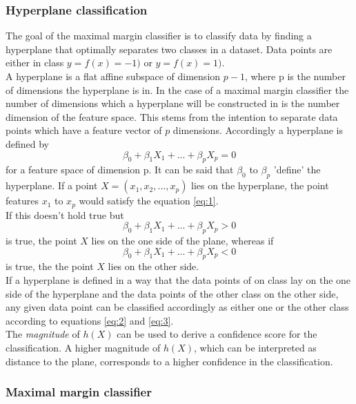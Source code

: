 \subsubsection*{Hyperplane classification}
The goal of the maximal margin classifier is to classify data by finding a hyperplane that optimally separates two classes in a dataset. Data points are either in class $y=f(x)=-1)$ or $y=f(x)=1)$. 
\\
A hyperplane is a flat affine subspace of dimension $p-1$, where p is the number of dimensions the hyperplane is in. In the case of a maximal margin classifier the number of dimensions which a hyperplane will be constructed in is the number dimension of the feature space. This stems from the intention to separate data points which have a feature vector of $p$ dimensions. Accordingly a hyperplane is defined by
\begin{equation} \label{eq:1}
\beta_0 + \beta_1 X_1 + ... + \beta_p X_p = 0
\end{equation}
for a feature space of dimension p. It can be said that $\beta_0$  to $\beta_p$ 'define' the hyperplane.
If a point $X=(x_1,x_2,...,x_p)$ lies on the hyperplane, the point features $x_1$ to $x_p$ would satisfy the equation \ref{eq:1}.
\\
If this doesn't hold true but
\begin{equation} \label{eq:2}
\beta _0 + \beta _1 X_1 + ... + \beta_p X_p > 0
\end{equation}
is true, the point $X$ lies on the one side of the plane, whereas if 
\begin{equation} \label{eq:3}
\beta_0 + \beta_1 X_1 + ... + \beta_p X_p < 0
\end{equation}
is true, the the point $X$ lies on the other side. 
\\
If a hyperplane is defined in a way that the data points of on class lay on the one side of the hyperplane and the data points of the other class on the other side, any given data point can be classified accordingly as either one or the other class according to equations \ref{eq:2} and \ref{eq:3}.
\\
The \emph{magnitude} of $h(X)$ can be used to derive a confidence score for the classification. A higher magnitude of $h(X)$, which can be interpreted as distance to the plane, corresponds to a higher confidence in the classification.


\subsubsection*{Maximal margin classifier}

